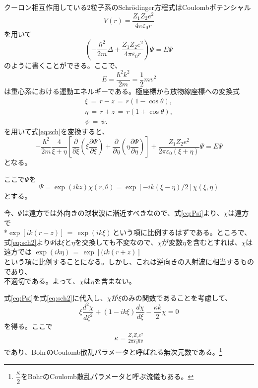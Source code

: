 \documentclass[a4paper,11pt,dvipdfmx]{jsarticle}
\begin{document}
クーロン相互作用している2粒子系のSchrödinger方程式はCoulombポテンシャル
\begin{equation*}
    V(r)=\frac{Z_{1}Z_{2}e^{2}}{4\pi\varepsilon_{0}r} 
\end{equation*}
を用いて
\begin{equation}
\left(-\frac{\hbar^{2}}{2m}\Delta + \frac{Z_{1}Z_{2}e^{2}}{4\pi\varepsilon_{0}r}\right)\Psi =E\Psi
\label{eq:sch}
\end{equation}
のように書くことができる。ここで、
\begin{equation}
E=\frac{\hbar^{2}k^{2}}{2m}=\frac{1}{2}mv^{2}
\end{equation}
は重心系における運動エネルギーである。極座標から放物線座標への変換式
\begin{gather*}     
    　　\xi\,=\, r - z \,=\, r\left(1 - \cos\theta\right), \\  
    　　\eta\,=\, r + z \,=\, r\left(1 + \cos\theta\right), \\
      \psi\,=\,\psi. 
\end{gather*}
を用いて式\eqref{eq:sch}を変換すると、
\begin{equation}
-\frac{\hbar^{2}}{2m}\frac{4}{\xi+\eta}\left[\frac{\partial}{\partial\xi}\left(\xi\frac{\partial\Psi}{\partial\xi}\right)+ \frac{\partial}{\partial\eta}\left(\eta\frac{\partial\Psi}{\partial\eta}\right)\right]+ \frac{Z_{1}Z_{2}e^{2}}{2\pi\varepsilon_{0}\left(\xi+\eta\right)}\Psi =E\Psi
\label{eq:sch2}
\end{equation}
となる。

ここで$\Psi$を
\begin{equation}
    \Psi = \exp(ikz)\chi\left(r,\theta\right)=  \exp\left[-ik\left(\xi-\eta\right)/2\right]\chi\left(\xi,\eta\right)
    \label{eq:Psi}
\end{equation}
とする。

今、$\Psi$は遠方では外向きの球状波に漸近すべきなので、式\eqref{eq:Psi}より、$\chi$は遠方で \\*\:$\exp[ik(r-z)] \,=\,\exp(ik\xi)$\,という項に比例するはずである。ところで、式\eqref{eq:sch2}より$\Psi$は$\xi$と$\eta$を交換しても不変なので、$\chi$が変数$\eta$を含むとすれば、$\chi$は遠方では $\exp(ik\eta) \,=\,\exp[(ik(r+z)]$\, \\
という項に比例することになる。しかし、これは逆向きの入射波に相当するものであり、 \\
不適切である。よって、$\chi$は$\eta$を含まない。

式\eqref{eq:Psi}を式\eqref{eq:sch2}に代入し、$\chi$が$\xi$のみの関数であることを考慮して、
\begin{equation}
    \xi\frac{d^{2}\chi}{d\xi^{2}} + \left(1 - ik\xi\right)\frac{d\chi}{d\xi} -\frac{\kappa k}{2}\chi = 0
    \label{eq:tyokika}
\end{equation}
を得る。ここで
\begin{gather*}
\kappa = \frac{Z_{1}Z_{2}e^{2}}{2\pi\varepsilon_{0}\hbar v}
\end{gather*}
であり、BohrのCoulomb散乱パラメータと呼ばれる無次元数である。\footnote{$\dfrac{\kappa}{2}$をBohrのCoulomb散乱パラメータと呼ぶ流儀もある。}
\end{document}
